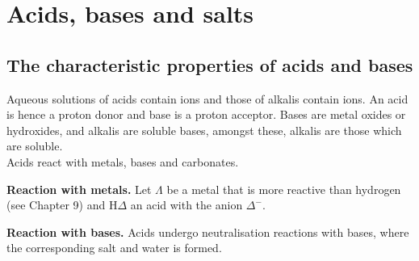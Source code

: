 \section{Acids, bases and salts}
\subsection{The characteristic properties of acids and bases}

Aqueous solutions of acids contain  ions and those of alkalis contain  ions. An
acid is hence a proton donor and base is a proton acceptor. Bases are metal oxides or hydroxides,
and alkalis are soluble bases, amongst these, alkalis are those which are soluble.\\

Acids react with metals, bases and carbonates.

\textbf{Reaction with metals.} Let $\Lambda$ be a metal that is more reactive than hydrogen (see
Chapter 9) and H$\Delta$ an acid with the anion $\Delta^-$.
\begin{center}
\end{center}

\textbf{Reaction with bases.} Acids undergo neutralisation reactions with bases, where the
corresponding salt and water is formed.

\begin{center}
\end{center}

